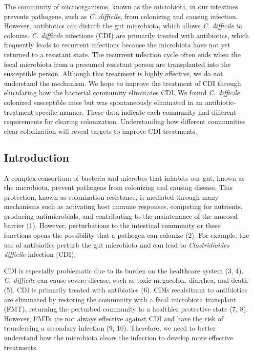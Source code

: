 \documentclass[12pt,]{article}
\begin{document}
The community of microorganisms, known as the microbiota, in our
intestines prevents pathogens, such as \emph{C. difficile}, from
colonizing and causing infection. However, antibiotics can disturb the
gut microbiota, which allows \emph{C. difficile} to colonize. \emph{C.
difficile} infections (CDI) are primarily treated with antibiotics,
which frequently leads to recurrent infections because the microbiota
have not yet returned to a resistant state. The recurrent infection
cycle often ends when the fecal microbiota from a presumed resistant
person are transplanted into the susceptible person. Although this
treatment is highly effective, we do not understand the mechanism. We
hope to improve the treatment of CDI through elucidating how the
bacterial community eliminates CDI. We found \emph{C. difficile}
colonized susceptible mice but was spontaneously eliminated in an
antibiotic-treatment specific manner. These data indicate each community
had different requirements for clearing colonization. Understanding how
different communities clear colonization will reveal targets to improve
CDI treatments.

\newpage

\hypertarget{introduction}{%
\subsection{Introduction}\label{introduction}}

A complex consortium of bacteria and microbes that inhabits our gut,
known as the microbiota, prevent pathogens from colonizing and causing
disease. This protection, known as colonization resistance, is mediated
through many mechanisms such as activating host immune responses,
competing for nutrients, producing antimicrobials, and contributing to
the maintenance of the mucosal barrier (1). However, perturbations to
the intestinal community or these functions opens the possibility that a
pathogen can colonize (2). For example, the use of antibiotics perturb
the gut microbiota and can lead to \emph{Clostridioides difficile}
infection (CDI).

CDI is especially problematic due to its burden on the healthcare system
(3, 4). \emph{C. difficile} can cause severe disease, such as toxic
megacolon, diarrhea, and death (5). CDI is primarily treated with
antibiotics (6). CDIs recalcitrant to antibiotics are eliminated by
restoring the community with a fecal microbiota transplant (FMT),
returning the perturbed community to a healthier protective state (7,
8). However, FMTs are not always effective against CDI and have the risk
of transferring a secondary infection (9, 10). Therefore, we need to
better understand how the microbiota clears the infection to develop
more effective treatments.
\end{document}
